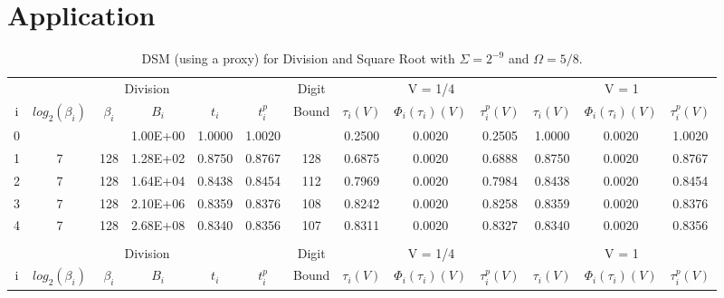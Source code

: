 \documentclass[10pt]{article}
\theoremstyle{definition}
\theoremstyle{remark}
\numberwithin{equation}{section}
\begin{document}
\section{Application\label{sec:application}}

\begin{sidewaystable}
	\centering
	\caption{DSM (using a proxy) for Division and Square Root with $\Sigma = 2^{-9}$ and $\Omega = 5/8$.\label{tab:dsm_div_sqrt}}%
	\begin{tabular}{ccccccccccccc}
		\hline
		\multicolumn{6}{|c}{Division}                 & \multicolumn{1}{c|}{Digit} & \multicolumn{3}{c|}{V = 1/4} & \multicolumn{3}{c|}{V = 1} \\
		\multicolumn{1}{|c}{i} & $log_2(\beta_i)$ & $\beta_i$ & $B_i$ & $t_i$ & $t^p_i$ & \multicolumn{1}{c|}{Bound} & $\tau_i(V)$ & $\Phi_i(\tau_i)(V)$ & \multicolumn{1}{c|}{$\tau_i^p(V)$} & $\tau_i(V)$ & $\Phi_i(\tau_i)(V)$ & \multicolumn{1}{c|}{$\tau_i^p(V)$} \\
		\hline
		0     &       &       & 1.00E+00 & 1.0000 & 1.0020 &       & 0.2500 & 0.0020 & 0.2505 & 1.0000 & 0.0020 & 1.0020 \\
		1     & 7     & 128   & 1.28E+02 & 0.8750 & 0.8767 & 128   & 0.6875 & 0.0020 & 0.6888 & 0.8750 & 0.0020 & 0.8767 \\
		2     & 7     & 128   & 1.64E+04 & 0.8438 & 0.8454 & 112   & 0.7969 & 0.0020 & 0.7984 & 0.8438 & 0.0020 & 0.8454 \\
		3     & 7     & 128   & 2.10E+06 & 0.8359 & 0.8376 & 108   & 0.8242 & 0.0020 & 0.8258 & 0.8359 & 0.0020 & 0.8376 \\
		4     & 7     & 128   & 2.68E+08 & 0.8340 & 0.8356 & 107   & 0.8311 & 0.0020 & 0.8327 & 0.8340 & 0.0020 & 0.8356 \\
		&       &       &       &       &       &       & & & & & & \\
		\hline
		\multicolumn{6}{|c}{Division}                 & \multicolumn{1}{c|}{Digit} & \multicolumn{3}{c|}{V = 1/4} & \multicolumn{3}{c|}{V = 1} \\
		\multicolumn{1}{|c}{i} & $log_2(\beta_i)$ & $\beta_i$ & $B_i$ & $t_i$ & $t^p_i$ & \multicolumn{1}{c|}{Bound} & $\tau_i(V)$ & $\Phi_i(\tau_i)(V)$ & \multicolumn{1}{c|}{$\tau_i^p(V)$} & $\tau_i(V)$ & $\Phi_i(\tau_i)(V)$ & \multicolumn{1}{c|}{$\tau_i^p(V)$} \\

\end{tabular}
\end{sidewaystable}
\end{document}
